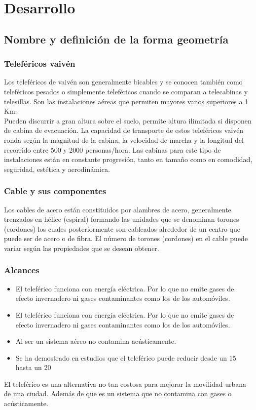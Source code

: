 \documentclass{article}
\begin{document}
\section{Desarrollo}
\subsection{Nombre y definición de la forma geometría}
\subsubsection{Teleféricos vaivén }
Los teleféricos de vaivén son generalmente bicables y se conocen también como teleféricos pesados o simplemente teleféricos cuando se comparan a telecabinas y telesillas. Son las instalaciones aéreas que permiten mayores vanos superiores a 1 Km\cite{rf1}.\\
Pueden discurrir a gran altura sobre el suelo, permite altura ilimitada si disponen de cabina de evacuación. La capacidad de transporte de estos teleféricos vaivén ronda según la magnitud de la cabina, la velocidad de marcha y la longitud del recorrido entre 500 y 2000 personas/hora.
Las cabinas para este tipo de instalaciones están en constante progresión, tanto en tamaño como en comodidad, seguridad, estética y aerodinámica.

\subsubsection{Cable y sus componentes}
Los cables de acero están constituidos por alambres de acero, generalmente trenzados en hélice (espiral) formando las unidades que se denominan torones (cordones) los cuales posteriormente son cableados alrededor de un centro que puede ser de acero o de fibra. El número de torones (cordones) en el cable puede variar según las propiedades que se desean obtener\cite{rf2}.
\subsubsection{Alcances}
\begin{itemize}
    \item El teleférico funciona con energía eléctrica. Por lo que no emite gases de efecto invernadero ni gases contaminantes como los de los automóviles.
    \item El teleférico funciona con energía eléctrica. Por lo que no emite gases de efecto invernadero ni gases contaminantes como los de los automóviles.
    \item Al ser un sistema aéreo no contamina acústicamente.
    \item Se ha demostrado en estudios que el teleférico puede reducir desde un 15 hasta un 20%
\end{itemize}
El teleférico es una alternativa no tan costosa para mejorar la movilidad urbana de una ciudad. Además de que es un sistema que no contamina con gases o acústicamente.
\end{document}
